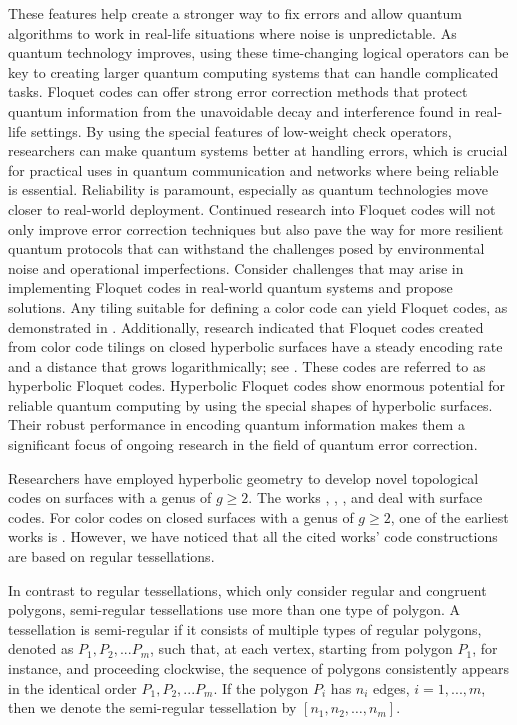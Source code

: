 \documentclass[%
reprint,
amsmath,amssymb,
aps,
]{revtex4-2}
\begin{document}
These features help create a stronger way to fix errors and allow quantum algorithms to work in real-life situations where noise is unpredictable. As quantum technology improves, using these time-changing logical operators can be key to creating larger quantum computing systems that can handle complicated tasks. Floquet codes can offer strong error correction methods that protect quantum information from the unavoidable decay and interference found in real-life settings. By using the special features of low-weight check operators, researchers can make quantum systems better at handling errors, which is crucial for practical uses in quantum communication and networks where being reliable is essential. Reliability is paramount, especially as quantum technologies move closer to real-world deployment. Continued research into Floquet codes will not only improve error correction techniques but also pave the way for more resilient quantum protocols that can withstand the challenges posed by environmental noise and operational imperfections. Consider challenges that may arise in implementing Floquet codes in real-world quantum systems and propose solutions. Any tiling suitable for defining a color code can yield Floquet codes, as demonstrated in \cite{Vuillot2021}. Additionally, research indicated that Floquet codes created from color code tilings on closed hyperbolic surfaces have a steady encoding rate and a distance that grows logarithmically; see \cite{Breuckmann2024}. These codes are referred to as hyperbolic Floquet codes. Hyperbolic Floquet codes show enormous potential for reliable quantum computing by using the special shapes of hyperbolic surfaces. Their robust performance in encoding quantum information makes them a significant focus of ongoing research in the field of quantum error correction. 

Researchers have employed hyperbolic geometry to develop novel topological codes on surfaces with a genus of $g \geq 2$. The works \cite{clarice}, \cite{albuquerque2009}, \cite{brandaniselfdual}, and \cite{Breuckmann2016} deal with surface codes. For color codes on closed surfaces with a genus of $g \geq 2$, one of the earliest works is \cite{waldir2018}. However, we have noticed that all the cited works' code constructions are based on regular tessellations.

In contrast to regular tessellations, which only consider regular and congruent polygons, semi-regular tessellations use more than one type of polygon. A tessellation is semi-regular if it consists of multiple types of regular polygons, denoted as $P_1, P_2, ...P_m$, such that, at each vertex, starting from polygon $P_1$, for instance, and proceeding clockwise, the sequence of polygons consistently appears in the identical order $P_1, P_2, ...P_m$. If the polygon $P_i$ has $n_i$ edges, $i=1,...,m$, then we denote the semi-regular tessellation by $[n_1, n_2, \ldots,n_m]$.
\end{document}
